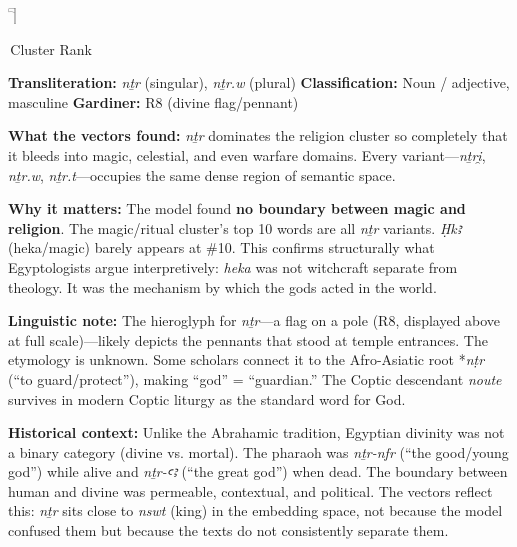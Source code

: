 \documentclass[11pt, a4paper]{article}
\newcommand{\bighiero}[1]{{\normalfont\hierofont\fontsize{48}{56}\selectfont #1}}
\newcommand{\displayglyph}[1]{%
  \begin{center}
  \bighiero{#1}
  \end{center}
  \vspace{-6pt}
}
\newcommand{\methodtag}[1]{%
  \noindent\colorbox{tagbg}{\small\sffamily\color{nightsky}\,#1\,}\par\smallskip%
}
\newenvironment{insightbox}[1][]{%
  \def\boxtitle{#1}%
  \begin{oframed}%
  \noindent{\bfseries\color{lapis}\boxtitle}\par\smallskip%
}{%
  \end{oframed}%
}
\begin{document}
\begin{insightbox}[\textit{nṯr} --- God / Divine \hfill Cluster: religion (\#1)]

\displayglyph{𓊹}

\methodtag{Cluster Rank}

\textbf{Transliteration:} \textit{nṯr} (singular), \textit{nṯr.w} (plural) \quad
\textbf{Classification:} Noun / adjective, masculine \quad
\textbf{Gardiner:} R8 (divine flag/pennant)

\medskip
\textbf{What the vectors found:} \textit{nṯr} dominates the religion cluster so completely that it bleeds into magic, celestial, and even warfare domains. Every variant---\textit{nṯri̯}, \textit{nṯr.w}, \textit{nṯr.t}---occupies the same dense region of semantic space.

\medskip
\textbf{Why it matters:} The model found \textbf{no boundary between magic and religion}. The magic/ritual cluster's top 10 words are all \textit{nṯr} variants. \textit{Ḥkꜣ} (heka/magic) barely appears at \#10. This confirms structurally what Egyptologists argue interpretively: \textit{heka} was not witchcraft separate from theology. It was the mechanism by which the gods acted in the world.

\medskip
\textbf{Linguistic note:} The hieroglyph for \textit{nṯr}---a flag on a pole (R8, displayed above at full scale)---likely depicts the pennants that stood at temple entrances. The etymology is unknown. Some scholars connect it to the Afro-Asiatic root *\textit{nṭr} (``to guard/protect''), making ``god'' = ``guardian.'' The Coptic descendant \textit{noute} survives in modern Coptic liturgy as the standard word for God.

\medskip
\textbf{Historical context:} Unlike the Abrahamic tradition, Egyptian divinity was not a binary category (divine vs. mortal). The pharaoh was \textit{nṯr-nfr} (``the good/young god'') while alive and \textit{nṯr-ꜥꜣ} (``the great god'') when dead. The boundary between human and divine was permeable, contextual, and political. The vectors reflect this: \textit{nṯr} sits close to \textit{nswt} (king) in the embedding space, not because the model confused them but because the texts do not consistently separate them.
\end{insightbox}
\end{document}

